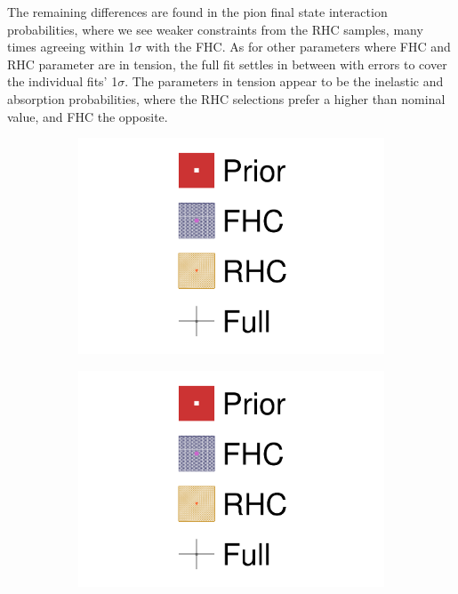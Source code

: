 The remaining differences are found in the pion final state interaction probabilities, where we see weaker constraints from the RHC samples, many times agreeing within 1$\sigma$ with the FHC. As for other parameters where FHC and RHC parameter are in tension, the full fit settles in between with errors to cover the individual fits' 1$\sigma$. The parameters in tension appear to be the inelastic and absorption probabilities, where the RHC selections prefer a higher than nominal value, and FHC the opposite.
\begin{figure}[h]
	\centering
	\begin{subfigure}[t]{0.49\textwidth}
		\includegraphics[width=\textwidth,page=18, trim={0mm 0mm 0mm 9mm}, clip]{figures/mach3/2018/data/2018a_FixedCov_RedCov_Mpi_NeuOnly_Data_merge_2018a_FixedCov_RedCov_Mpi_NeuBarOnly_Data_merge_2018a_FixedCov_RedCov_Mpi_Data_merge}
	\end{subfigure}
	\begin{subfigure}[t]{0.49\textwidth}
		\includegraphics[width=\textwidth,page=19, trim={0mm 0mm 0mm 9mm}, clip]{figures/mach3/2018/data/2018a_FixedCov_RedCov_Mpi_NeuOnly_Data_merge_2018a_FixedCov_RedCov_Mpi_NeuBarOnly_Data_merge_2018a_FixedCov_RedCov_Mpi_Data_merge}
	\end{subfigure}
	

\end{figure}

